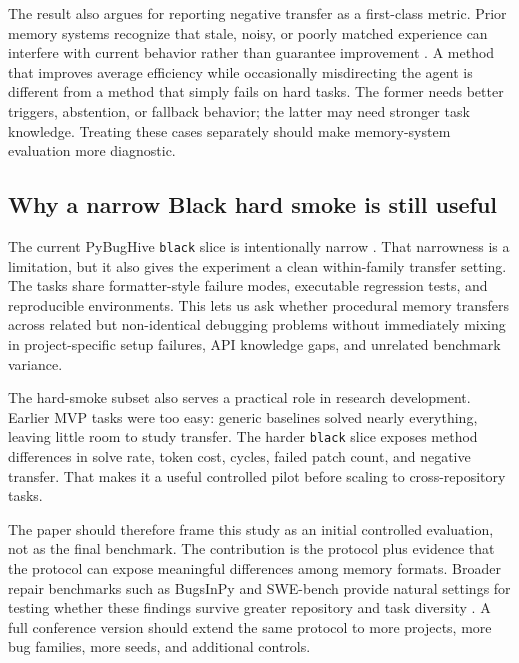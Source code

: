 The result also argues for reporting negative transfer as a first-class metric. Prior memory systems recognize that stale, noisy, or poorly matched experience can interfere with current behavior rather than guarantee improvement \cite{chen2024automanual,wang2025workflowmemory,fang2026memp,ouyang2026reasoningbank}. A method that improves average efficiency while occasionally misdirecting the agent is different from a method that simply fails on hard tasks. The former needs better triggers, abstention, or fallback behavior; the latter may need stronger task knowledge. Treating these cases separately should make memory-system evaluation more diagnostic.

\subsection{Why a narrow Black hard smoke is still useful}
\label{sec:discussion_black_slice}

The current PyBugHive \texttt{black} slice is intentionally narrow \cite{antal2024pybughive}. That narrowness is a limitation, but it also gives the experiment a clean within-family transfer setting. The tasks share formatter-style failure modes, executable regression tests, and reproducible environments. This lets us ask whether procedural memory transfers across related but non-identical debugging problems without immediately mixing in project-specific setup failures, API knowledge gaps, and unrelated benchmark variance.

The hard-smoke subset also serves a practical role in research development. Earlier MVP tasks were too easy: generic baselines solved nearly everything, leaving little room to study transfer. The harder \texttt{black} slice exposes method differences in solve rate, token cost, cycles, failed patch count, and negative transfer. That makes it a useful controlled pilot before scaling to cross-repository tasks.

The paper should therefore frame this study as an initial controlled evaluation, not as the final benchmark. The contribution is the protocol plus evidence that the protocol can expose meaningful differences among memory formats. Broader repair benchmarks such as BugsInPy and SWE-bench provide natural settings for testing whether these findings survive greater repository and task diversity \cite{widyasari2020bugsinpy,jimenez2024swebench}. A full conference version should extend the same protocol to more projects, more bug families, more seeds, and additional controls.

